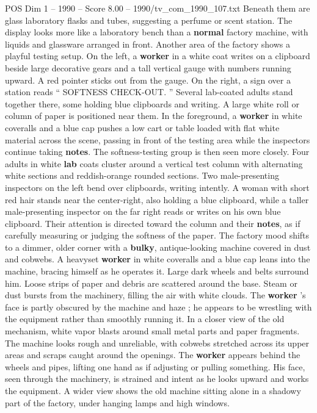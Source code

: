 \begin{textsample}{POS Dim 1 – 1990 – Score 8.00 – 1990/tv\_com\_1990\_107.txt}
Beneath them are glass laboratory flasks and tubes, suggesting a perfume or scent station.
The display looks more like a laboratory bench than a \textbf{normal} factory machine, with liquids and glassware arranged in front.
Another area of the factory shows a playful testing setup.
On the left, a \textbf{worker} in a white coat writes on a clipboard beside large decorative gears and a tall vertical gauge with numbers running upward.
A red pointer sticks out from the gauge.
On the right, a sign over a station reads “ SOFTNESS CHECK-OUT. ” Several lab-coated adults stand together there, some holding blue clipboards and writing.
A large white roll or column of paper is positioned near them.
In the foreground, a \textbf{worker} in white coveralls and a blue cap pushes a low cart or table loaded with flat white material across the scene, passing in front of the testing area while the inspectors continue taking \textbf{notes}.
The softness-testing group is then seen more closely.
Four adults in white \textbf{lab} coats cluster around a vertical test column with alternating white sections and reddish-orange rounded sections.
Two male-presenting inspectors on the left bend over clipboards, writing intently.
A woman with short red hair stands near the center-right, also holding a blue clipboard, while a taller male-presenting inspector on the far right reads or writes on his own blue clipboard.
Their attention is directed toward the column and their \textbf{notes}, as if carefully measuring or judging the softness of the paper.
The factory mood shifts to a dimmer, older corner with a \textbf{bulky}, antique-looking machine covered in dust and cobwebs.
A heavyset \textbf{worker} in white coveralls and a blue cap leans into the machine, bracing himself as he operates it.
Large dark wheels and belts surround him.
Loose strips of paper and debris are scattered around the base.
Steam or dust bursts from the machinery, filling the air with white clouds.
The \textbf{worker} ’s face is partly obscured by the machine and haze ; he appears to be wrestling with the equipment rather than smoothly running it.
In a closer view of the old mechanism, white vapor blasts around small metal parts and paper fragments.
The machine looks rough and unreliable, with cobwebs stretched across its upper areas and scraps caught around the openings.
The \textbf{worker} appears behind the wheels and pipes, lifting one hand as if adjusting or pulling something.
His face, seen through the machinery, is strained and intent as he looks upward and works the equipment.
A wider view shows the old machine sitting alone in a shadowy part of the factory, under hanging lamps and high windows.

\end{textsample}
